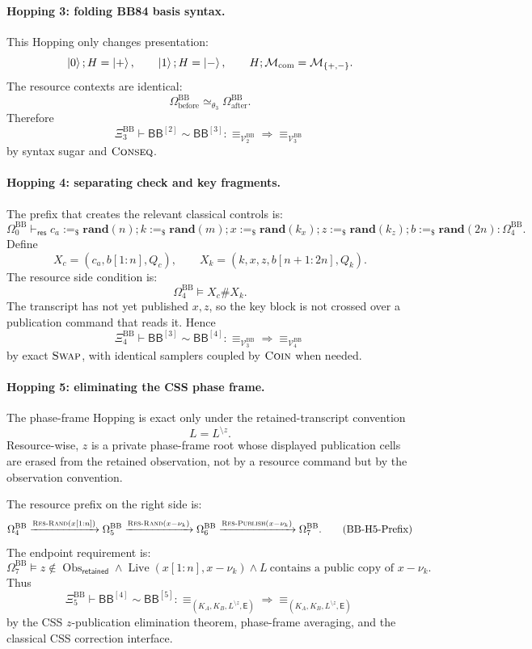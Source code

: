 \documentclass{report}
\theoremstyle{defn_style}
\providecommand{\Live}{\operatorname{Live}}
\providecommand{\Obs}{\operatorname{Obs}}
\providecommand{\HopBB}[1]{\mathsf{BB}^{[#1]}}
\begin{document}
\paragraph{Hopping 3: folding BB84 basis syntax.}
This Hopping only changes presentation:
\[
\ket0;H=\ket+,
\qquad
\ket1;H=\ket-,
\qquad
H;\mathcal M_{\mathrm{com}}=\mathcal M_{\{+,-\}}.
\]
The resource contexts are identical:
\[
\Omega^{\mathrm{BB}}_{\mathrm{before}}
\simeq_{\theta_3}
\Omega^{\mathrm{BB}}_{\mathrm{after}}.
\tag{BB-H3-ResourceAlign}\label{BB-H3-ResourceAlign}
\]
Therefore
\[
\Xi^{\mathrm{BB}}_3
\vdash
\HopBB{2}\sim\HopBB{3}:
\equiv_{\mathcal V^{\mathrm{BB}}_2}
\Longrightarrow
\equiv_{\mathcal V^{\mathrm{BB}}_3}
\tag{BB-H3-Rel}\label{BB-H3-Rel}
\]
by syntax sugar and \(\textsc{Conseq}\).

\paragraph{Hopping 4: separating check and key fragments.}
The prefix that creates the relevant classical controls is:
\[
\Omega^{\mathrm{BB}}_0
\vdash_{\mathsf{res}}
c_a:=_\$\mathbf{rand}(n);
k:=_\$\mathbf{rand}(m);
x:=_\$\mathbf{rand}(k_x);
z:=_\$\mathbf{rand}(k_z);
b:=_\$\mathbf{rand}(2n)
:
\Omega^{\mathrm{BB}}_4.
\tag{BB-H4-Prefix}\label{BB-H4-Prefix}
\]
Define
\[
X_c=(c_a,b[1{:}n],Q_c),
\qquad
X_k=(k,x,z,b[n+1{:}2n],Q_k).
\]
The resource side condition is:
\[
\Omega^{\mathrm{BB}}_4
\models
X_c\#X_k.
\tag{BB-H4-SwapReq}
\]
The transcript has not yet published \(x,z\), so the key block is not crossed
over a publication command that reads it.  Hence
\[
\Xi^{\mathrm{BB}}_4
\vdash
\HopBB{3}\sim\HopBB{4}:
\equiv_{\mathcal V^{\mathrm{BB}}_3}
\Longrightarrow
\equiv_{\mathcal V^{\mathrm{BB}}_4}
\tag{BB-H4-Rel}\label{BB-H4-Rel}
\]
by exact \(\textsc{Swap}\), with identical samplers coupled by \(\textsc{Coin}\)
when needed.

\paragraph{Hopping 5: eliminating the CSS phase frame.}
The phase-frame Hopping is exact only under the retained-transcript convention
\[
  L=L^{\setminus z}.
\]
Resource-wise, \(z\) is a private phase-frame root whose displayed publication
cells are erased from the retained observation, not by a resource command but by
the observation convention.

The resource prefix on the right side is:
\[
\Omega^{\mathrm{BB}}_4
\xrightarrow{\textsc{Res-Rand}(x[1{:}n])}
\Omega^{\mathrm{BB}}_5
\xrightarrow{\textsc{Res-Rand}(x-\nu_k)}
\Omega^{\mathrm{BB}}_6
\xrightarrow{\textsc{Res-Publish}(x-\nu_k)}
\Omega^{\mathrm{BB}}_7.
\tag{BB-H5-Prefix}\label{BB-H5-Prefix}
\]
The endpoint requirement is:
\[
\Omega^{\mathrm{BB}}_7
\models
z\notin\Obs_{\mathsf{retained}}
\land
\Live(x[1{:}n],x-\nu_k)
\land
L\ \text{contains a public copy of }x-\nu_k.
\tag{BB-H5-Req}
\]
Thus
\[
\Xi^{\mathrm{BB}}_5
\vdash
\HopBB{4}\sim\HopBB{5}:
\equiv_{(K_A,K_B,L^{\setminus z},\mathsf E)}
\Longrightarrow
\equiv_{(K_A,K_B,L^{\setminus z},\mathsf E)}
\tag{BB-H5-Rel}\label{BB-H5-Rel}
\]
by the CSS \(z\)-publication elimination theorem, phase-frame averaging, and
the classical CSS correction interface.
\end{document}
